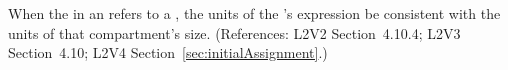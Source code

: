 When the  in an \InitialAssignment refers to a
\Compartment, the units of the \InitialAssignment's  expression
 be consistent with the units of that compartment's size.  (References:
L2V2 Section~4.10.4; L2V3 Section~4.10; L2V4 Section~\ref{sec:initialAssignment}.)
